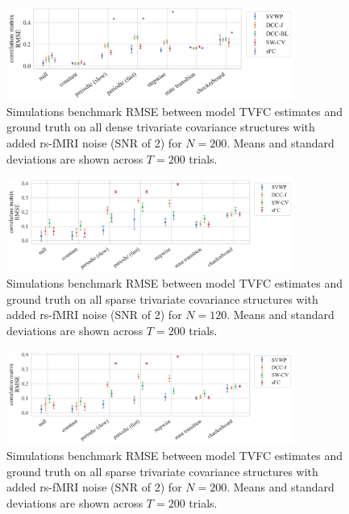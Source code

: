\begin{figure}[ht]
  \centering
  \includegraphics[width=0.84\textwidth]{fig/sim/d3d/N0200_T0200/no_noise/correlation_matrix_RMSE}
  \caption{
    Simulations benchmark RMSE between model TVFC estimates and ground truth on all dense trivariate covariance structures with added rs-fMRI noise (SNR of 2) for $N = 200$.
    Means and standard deviations are shown across $T = 200$ trials.
  }\label{fig:results-sim-d3d-200-no-noise-all-correlation-matrix-RMSE}
\end{figure}


\begin{figure}[ht]
  \centering
  \includegraphics[width=0.84\textwidth]{fig/sim/d3s/N0120_T0200/no_noise/correlation_matrix_RMSE}
  \caption{
    Simulations benchmark RMSE between model TVFC estimates and ground truth on all sparse trivariate covariance structures with added rs-fMRI noise (SNR of 2) for $N = 120$.
    Means and standard deviations are shown across $T = 200$ trials.
  }\label{fig:results-sim-d3s-120-no-noise-all-correlation-matrix-RMSE}
\end{figure}


\begin{figure}[ht]
  \centering
  \includegraphics[width=0.84\textwidth]{fig/sim/d3s/N0200_T0200/no_noise/correlation_matrix_RMSE}
  \caption{
    Simulations benchmark RMSE between model TVFC estimates and ground truth on all sparse trivariate covariance structures with added rs-fMRI noise (SNR of 2) for $N = 200$.
    Means and standard deviations are shown across $T = 200$ trials.
  }\label{fig:results-sim-d3s-200-no-noise-all-correlation-matrix-RMSE}
\end{figure}


